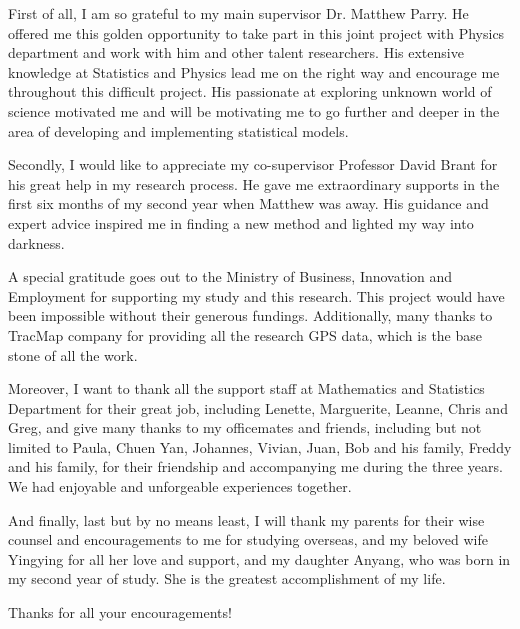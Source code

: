 First of all, I am so grateful to my main supervisor Dr. Matthew Parry. He offered me this golden opportunity to take part in this joint project with Physics department and work with him and other talent researchers. His extensive knowledge at Statistics and Physics lead me on the right way and encourage me throughout this difficult project. His passionate at exploring unknown world of science motivated me and will be motivating me to go further and deeper in the area of developing and implementing statistical models.  

Secondly, I would like to appreciate my co-supervisor Professor David Brant for his great help in my research process. He gave me extraordinary supports in the first six months of my second year when Matthew was away. His guidance and expert advice inspired me in finding a new method and lighted my way into darkness. 

A special gratitude goes out to the Ministry of Business, Innovation and Employment for supporting my study and this research. This project would have been impossible without their generous fundings. Additionally, many thanks to TracMap company for providing all the research GPS data, which is the base stone of all the work. 

Moreover, I want to thank all the support staff at Mathematics and Statistics Department for their great job, including Lenette, Marguerite, Leanne, Chris and Greg, and give many thanks to my officemates and friends, including but not limited to Paula, Chuen Yan, Johannes, Vivian, Juan, Bob and his family, Freddy and his family, for their friendship and accompanying me during the three years. We had enjoyable and unforgeable experiences together. 

And finally, last but by no means least, I will thank my parents for their wise counsel and encouragements to me for studying overseas, and my beloved wife Yingying for all her love and support, and my daughter Anyang, who was born in my second year of study. She is the greatest accomplishment of my life.

Thanks for all your encouragements! 

